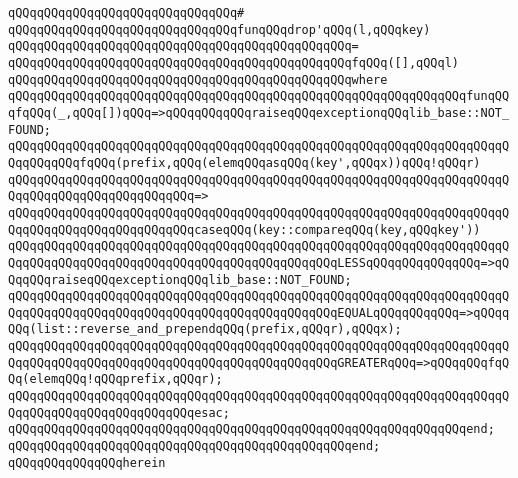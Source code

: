 \verb|qQQqqQQqqQQqqQQqqQQqqQQqqQQqqQQq#|\newline
\verb|qQQqqQQqqQQqqQQqqQQqqQQqqQQqqQQqfunqQQqdrop'qQQq(l,qQQqkey)|\newline
\verb|qQQqqQQqqQQqqQQqqQQqqQQqqQQqqQQqqQQqqQQqqQQqqQQq=|\newline
\verb|qQQqqQQqqQQqqQQqqQQqqQQqqQQqqQQqqQQqqQQqqQQqqQQqfqQQq([],qQQql)|\newline
\verb|qQQqqQQqqQQqqQQqqQQqqQQqqQQqqQQqqQQqqQQqqQQqqQQqwhere|\newline
\newline
\verb|qQQqqQQqqQQqqQQqqQQqqQQqqQQqqQQqqQQqqQQqqQQqqQQqqQQqqQQqqQQqqQQqfunqQQqfqQQq(_,qQQq[])qQQq=>qQQqqQQqqQQqraiseqQQqexceptionqQQqlib_base::NOT_FOUND;|\newline
\newline
\verb|qQQqqQQqqQQqqQQqqQQqqQQqqQQqqQQqqQQqqQQqqQQqqQQqqQQqqQQqqQQqqQQqqQQqqQQqqQQqqQQqfqQQq(prefix,qQQq(elemqQQqasqQQq(key',qQQqx))qQQq!qQQqr)|\newline
\verb|qQQqqQQqqQQqqQQqqQQqqQQqqQQqqQQqqQQqqQQqqQQqqQQqqQQqqQQqqQQqqQQqqQQqqQQqqQQqqQQqqQQqqQQqqQQqqQQq=>|\newline
\verb|qQQqqQQqqQQqqQQqqQQqqQQqqQQqqQQqqQQqqQQqqQQqqQQqqQQqqQQqqQQqqQQqqQQqqQQqqQQqqQQqqQQqqQQqqQQqqQQqcaseqQQq(key::compareqQQq(key,qQQqkey'))|\newline
\newline
\verb|qQQqqQQqqQQqqQQqqQQqqQQqqQQqqQQqqQQqqQQqqQQqqQQqqQQqqQQqqQQqqQQqqQQqqQQqqQQqqQQqqQQqqQQqqQQqqQQqqQQqqQQqqQQqqQQqqQQqLESSqQQqqQQqqQQqqQQq=>qQQqqQQqraiseqQQqexceptionqQQqlib_base::NOT_FOUND;|\newline
\verb|qQQqqQQqqQQqqQQqqQQqqQQqqQQqqQQqqQQqqQQqqQQqqQQqqQQqqQQqqQQqqQQqqQQqqQQqqQQqqQQqqQQqqQQqqQQqqQQqqQQqqQQqqQQqqQQqqQQqEQUALqQQqqQQqqQQq=>qQQqqQQq(list::reverse_and_prependqQQq(prefix,qQQqr),qQQqx);|\newline
\verb|qQQqqQQqqQQqqQQqqQQqqQQqqQQqqQQqqQQqqQQqqQQqqQQqqQQqqQQqqQQqqQQqqQQqqQQqqQQqqQQqqQQqqQQqqQQqqQQqqQQqqQQqqQQqqQQqqQQqGREATERqQQq=>qQQqqQQqfqQQq(elemqQQq!qQQqprefix,qQQqr);|\newline
\verb|qQQqqQQqqQQqqQQqqQQqqQQqqQQqqQQqqQQqqQQqqQQqqQQqqQQqqQQqqQQqqQQqqQQqqQQqqQQqqQQqqQQqqQQqqQQqqQQqesac;|\newline
\verb|qQQqqQQqqQQqqQQqqQQqqQQqqQQqqQQqqQQqqQQqqQQqqQQqqQQqqQQqqQQqqQQqend;|\newline
\verb|qQQqqQQqqQQqqQQqqQQqqQQqqQQqqQQqqQQqqQQqqQQqqQQqend;|\newline
\verb|qQQqqQQqqQQqqQQqherein|\newline
